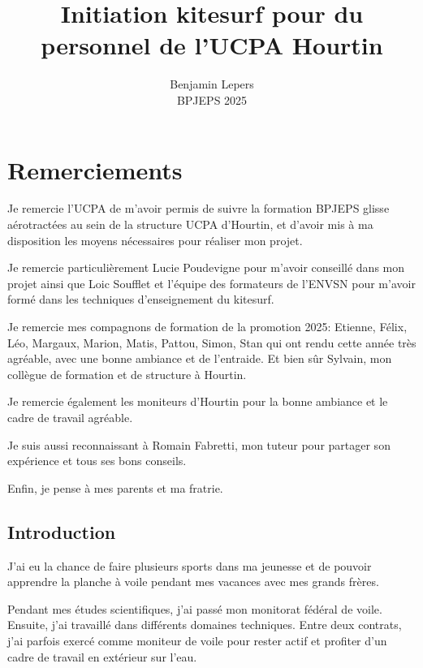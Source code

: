 \documentclass[11pt,a4paper]{report}
\begin{document}
\author{Benjamin Lepers \\ BPJEPS 2025 }
\title{Initiation kitesurf pour du personnel de l'UCPA Hourtin}
\maketitle
\chapter*{Remerciements}

Je remercie l'UCPA de m'avoir permis de suivre la formation
BPJEPS glisse aérotractées au sein de la structure UCPA
d'Hourtin, et d'avoir mis à ma disposition les moyens nécessaires
pour réaliser mon projet.
 
Je remercie particulièrement Lucie Poudevigne pour m'avoir
conseillé  dans mon projet ainsi que Loic Soufflet et l'équipe des
formateurs de l'ENVSN pour m'avoir formé dans les techniques
d'enseignement du kitesurf.

Je remercie mes compagnons de formation de la promotion 2025:
Etienne, Félix, Léo, Margaux, Marion, Matis, Pattou,
Simon, Stan qui ont rendu cette année très agréable,
avec une  bonne ambiance et de l'entraide.
Et bien s\^ur Sylvain, mon collègue de formation et 
de structure à Hourtin.

Je remercie également les moniteurs d'Hourtin  pour la
bonne ambiance et le cadre de travail agréable.

Je suis aussi reconnaissant à  Romain Fabretti, mon tuteur
pour partager son expérience et tous ses bons conseils.

Enfin, je pense à  mes parents et ma fratrie.

\tableofcontents
\newpage
\section{Introduction}

J'ai eu la chance de faire plusieurs sports dans ma jeunesse et de pouvoir apprendre la planche à voile pendant mes vacances avec mes grands frères.

Pendant mes études scientifiques, j'ai passé
mon monitorat fédéral de voile. Ensuite, j'ai travaillé dans différents
domaines techniques. Entre deux contrats, j'ai parfois exercé comme 
moniteur de voile pour rester actif et profiter d'un cadre de travail
en extérieur sur l'eau.

\end{document}
